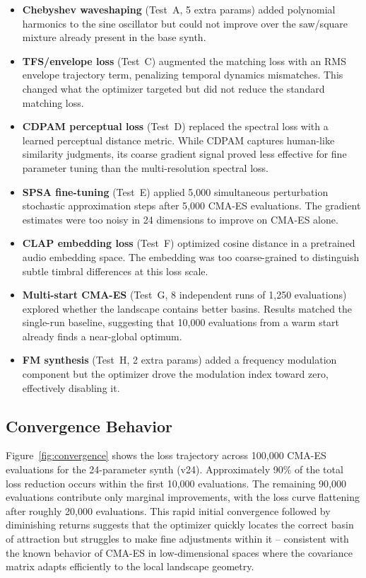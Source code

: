\begin{itemize}
    \item \textbf{Chebyshev waveshaping} (Test~A, 5 extra params) added polynomial harmonics to the sine oscillator but could not improve over the saw/square mixture already present in the base synth.
    \item \textbf{TFS/envelope loss} (Test~C) augmented the matching loss with an RMS envelope trajectory term, penalizing temporal dynamics mismatches. This changed what the optimizer targeted but did not reduce the standard matching loss.
    \item \textbf{CDPAM perceptual loss} (Test~D) replaced the spectral loss with a learned perceptual distance metric. While CDPAM captures human-like similarity judgments, its coarse gradient signal proved less effective for fine parameter tuning than the multi-resolution spectral loss.
    \item \textbf{SPSA fine-tuning} (Test~E) applied 5{,}000 simultaneous perturbation stochastic approximation steps after 5{,}000 CMA-ES evaluations. The gradient estimates were too noisy in 24 dimensions to improve on CMA-ES alone.
    \item \textbf{CLAP embedding loss} (Test~F) optimized cosine distance in a pretrained audio embedding space. The embedding was too coarse-grained to distinguish subtle timbral differences at this loss scale.
    \item \textbf{Multi-start CMA-ES} (Test~G, 8 independent runs of 1{,}250 evaluations) explored whether the landscape contains better basins. Results matched the single-run baseline, suggesting that 10{,}000 evaluations from a warm start already finds a near-global optimum.
    \item \textbf{FM synthesis} (Test~H, 2 extra params) added a frequency modulation component but the optimizer drove the modulation index toward zero, effectively disabling it.
\end{itemize}

\subsection{Convergence Behavior}

Figure~\ref{fig:convergence} shows the loss trajectory across 100{,}000 CMA-ES evaluations for the 24-parameter synth (v24).
Approximately 90\% of the total loss reduction occurs within the first 10{,}000 evaluations.
The remaining 90{,}000 evaluations contribute only marginal improvements, with the loss curve flattening after roughly 20{,}000 evaluations.
This rapid initial convergence followed by diminishing returns suggests that the optimizer quickly locates the correct basin of attraction but struggles to make fine adjustments within it -- consistent with the known behavior of CMA-ES in low-dimensional spaces where the covariance matrix adapts efficiently to the local landscape geometry.

